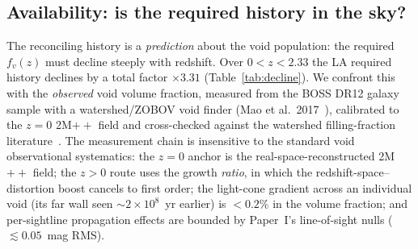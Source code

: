 \documentclass[aps,prd,twocolumn,nofootinbib,superscriptaddress,floatfix]{revtex4-2}
\newcommand{\fvz}{f_{v}(z)}
\begin{document}
\subsection{Availability: is the required history in the sky?}
\label{subsec:availability}

The reconciling history is a \emph{prediction} about the void population: the
required $\fvz$ must decline steeply with redshift. Over $0<z<2.33$ the LA
required history declines by a total factor $\times3.31$
(Table~\ref{tab:decline}). We confront this with the \emph{observed} void volume
fraction, measured from the BOSS DR12 galaxy sample with a watershed/ZOBOV void
finder (Mao et al.\ 2017~\cite{Mao2017}), calibrated to the $z=0$ 2M$++$ field
\cite{Carrick2015} and cross-checked against the watershed filling-fraction
literature~\cite{Pan2012,Williams2024}. The measurement chain is insensitive to
the standard void observational systematics: the $z=0$ anchor is the
real-space-reconstructed 2M$++$ field; the $z>0$ route uses the growth
\emph{ratio}, in which the redshift-space--distortion boost cancels to first
order; the light-cone gradient across an individual void (its far wall seen
$\sim\!2\times10^{8}$~yr earlier) is $<0.2\%$ in the volume fraction; and
per-sightline propagation effects are bounded by Paper~I's line-of-sight nulls
($\lesssim 0.05$~mag RMS).
\end{document}
